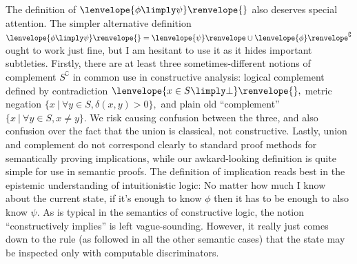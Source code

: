 \documentclass[12pt]{cmuthesis}
\theoremstyle{definition}
\theoremstyle{remark}
\newcommand{\fint}[1]{\lenvelope{#1}\renvelope}
\begin{document}
The definition of $\fint{\phi \limply \psi}{}$ also deserves special attention.
The simpler alternative definition $\fint{\phi \limply \psi}{} = \fint{\psi} \cup \fint{\phi}^\complement$ ought to work just fine, but I am hesitant to use it as it hides important subtleties.
Firstly, there are at least three sometimes-different notions of complement $S^\complement$ in common use in constructive analysis: logical complement defined by contradiction $\fint{x \in S \limply \bot}{},$ metric negation $\{x~|~\forall y \in S, \delta(x,y) > 0\},$ and plain old ``complement'' $\{x~|~\forall y \in S, x \neq y\}$.
We risk causing confusion between the three, and also confusion over the fact that the union is classical, not constructive.
Lastly, union and complement do not correspond clearly to standard proof methods for semantically proving implications, while our awkard-looking definition is quite simple for use in semantic proofs.
The definition of implication reads best in the epistemic understanding of intuitionistic logic: No matter how much I know about the current state, if it's enough to know $\phi$ then it has to be enough to also know $\psi$.
As is typical in the semantics of constructive logic, the notion ``constructively implies'' is left vague-sounding.
However, it really just comes down to the rule (as followed in all the other semantic cases) that the state may be inspected only with computable discriminators.
\end{document}
